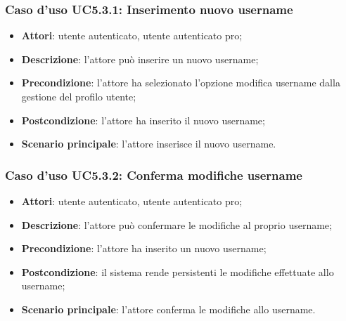 \subsubsection{Caso d'uso UC5.3.1: Inserimento nuovo username}

\begin{itemize}
	\item \textbf{Attori}: utente autenticato, utente autenticato pro;
	\item \textbf{Descrizione}: l'attore può inserire un nuovo username;
	\item \textbf{Precondizione}: l'attore ha selezionato l'opzione modifica username dalla gestione del profilo utente; 
	\item \textbf{Postcondizione}: l'attore ha inserito il nuovo username;
	\item \textbf{Scenario principale}: l'attore inserisce il nuovo username.
\end{itemize}

\subsubsection{Caso d'uso UC5.3.2: Conferma modifiche username}

\begin{itemize}
	\item \textbf{Attori}: utente autenticato, utente autenticato pro;
	\item \textbf{Descrizione}: l'attore può confermare le modifiche al proprio username;
	\item \textbf{Precondizione}: l'attore ha inserito un nuovo username;
	\item \textbf{Postcondizione}: il sistema rende persistenti le modifiche effettuate allo username;
	\item \textbf{Scenario principale}: l'attore conferma le modifiche allo username.
\end{itemize}

